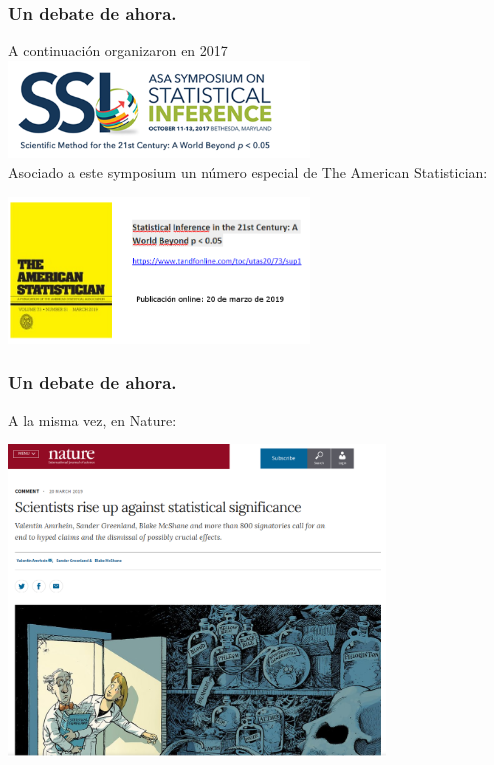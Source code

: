 \documentclass[9pt]{beamer}
\begin{document}
\begin{frame}
  \frametitle{Un debate de ahora.}
  A continuación organizaron en 2017
  \includegraphics[width=8cm]{images/asa_symposium}\\ 
  Asociado a este symposium un número especial de The American
  Statistician:

  \begin{center}
    \includegraphics[width=8cm]{images/asa_special_issue_2}
  \end{center}
 
\end{frame}

\begin{frame}
  \frametitle{Un debate de ahora.}
  A la misma vez, en Nature:\\ 
  \begin{center}
  \includegraphics[width=10cm]{images/nature_amrhein}
  \end{center}
\end{frame}
\end{document}
